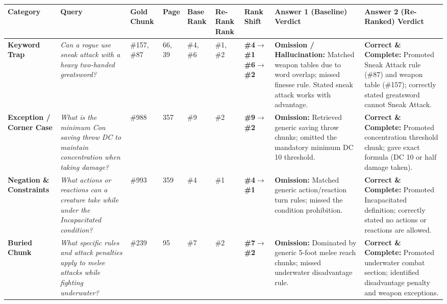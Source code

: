 \documentclass[10pt,a4paper]{article}
\begin{document}
\vspace{1pt}
\begin{table}[h!]
\centering
\scriptsize
\renewcommand{\arraystretch}{1.20}
\begin{tabularx}{\textwidth}{@{} L{1.7cm} L{3.0cm} C{1.1cm} C{0.7cm} C{0.9cm} C{0.9cm} C{1.1cm} Y Y @{}}
\hline
{}
\textbf{Category} & \textbf{Query} & \textbf{Gold Chunk} & \textbf{Page} & \textbf{Base Rank} & \textbf{Re-Rank Rank} & \textbf{Rank Shift} & \textbf{Answer 1 (Baseline) Verdict} & \textbf{Answer 2 (Re-Ranked) Verdict} \\
\hline
\textbf{Keyword Trap} & 
\textit{Can a rogue use sneak attack with a heavy two-handed greatsword?} & 
\#157, \#87 & 
66, 39 & 
\#4, \#6 & 
\#1, \#2 & 
\textbf{\color{succgreen}\#4$\rightarrow$\#1} \newline \textbf{\color{succgreen}\#6$\rightarrow$\#2} & 
\textbf{\color{alertred}Omission / Hallucination:} Matched weapon tables due to word overlap; missed finesse rule. Stated sneak attack works with advantage. & 
\textbf{\color{succgreen}Correct \& Complete:} Promoted Sneak Attack rule (\#87) and weapon table (\#157); correctly stated greatsword cannot Sneak Attack. \\

\textbf{Exception / Corner Case} & 
\textit{What is the minimum Con saving throw DC to maintain concentration when taking damage?} & 
\#988 & 
357 & 
\#9 & 
\#2 & 
\textbf{\color{succgreen}\#9$\rightarrow$\#2} & 
\textbf{\color{alertred}Omission:} Retrieved generic saving throw chunks; omitted the mandatory minimum DC 10 threshold. & 
\textbf{\color{succgreen}Correct \& Complete:} Promoted concentration threshold chunk; gave exact formula (DC 10 or half damage taken). \\

\textbf{Negation \& Constraints} & 
\textit{What actions or reactions can a creature take while under the Incapacitated condition?} & 
\#993 & 
359 & 
\#4 & 
\#1 & 
\textbf{\color{succgreen}\#4$\rightarrow$\#1} & 
\textbf{\color{alertred}Omission:} Matched generic action/reaction turn rules; missed the condition prohibition. & 
\textbf{\color{succgreen}Correct \& Complete:} Promoted Incapacitated definition; correctly stated no actions or reactions are allowed. \\

\textbf{Buried Chunk} & 
\textit{What specific rules and attack penalties apply to melee attacks while fighting underwater?} & 
\#239 & 
95 & 
\#7 & 
\#2 & 
\textbf{\color{succgreen}\#7$\rightarrow$\#2} & 
\textbf{\color{alertred}Omission:} Dominated by generic 5-foot melee reach chunks; missed underwater disadvantage rule. & 
\textbf{\color{succgreen}Correct \& Complete:} Promoted underwater combat section; identified disadvantage penalty and weapon exceptions. \\
\hline
\end{tabularx}
\end{table}
\end{document}
